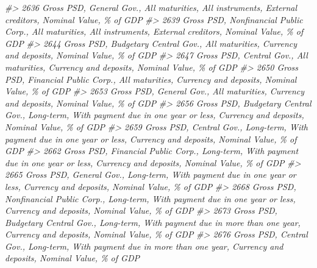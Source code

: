 \documentclass[
]{bxjsbook}
\newenvironment{Shaded}{\begin{snugshade}}{\end{snugshade}}
\newcommand{\CommentTok}[1]{\textcolor[rgb]{0.56,0.35,0.01}{\textit{#1}}}
\theoremstyle{definition}
\theoremstyle{definition}
\theoremstyle{definition}
\theoremstyle{definition}
\theoremstyle{remark}
\begin{document}
\begin{Shaded}
\begin{Highlighting}[]
\CommentTok{\#\textgreater{} 2636                                                                      Gross PSD, General Gov., All maturities, All instruments, External creditors, Nominal Value, \% of GDP}
\CommentTok{\#\textgreater{} 2639                                                         Gross PSD, Nonfinancial Public Corp., All maturities, All instruments, External creditors, Nominal Value, \% of GDP}
\CommentTok{\#\textgreater{} 2644                                                                          Gross PSD, Budgetary Central Gov., All maturities, Currency and deposits, Nominal Value, \% of GDP}
\CommentTok{\#\textgreater{} 2647                                                                                    Gross PSD, Central Gov., All maturities, Currency and deposits, Nominal Value, \% of GDP}
\CommentTok{\#\textgreater{} 2650                                                                          Gross PSD, Financial Public Corp., All maturities, Currency and deposits, Nominal Value, \% of GDP}
\CommentTok{\#\textgreater{} 2653                                                                                    Gross PSD, General Gov., All maturities, Currency and deposits, Nominal Value, \% of GDP}
\CommentTok{\#\textgreater{} 2656                                         Gross PSD, Budgetary Central Gov., Long{-}term, With payment due in one year or less, Currency and deposits, Nominal Value, \% of GDP}
\CommentTok{\#\textgreater{} 2659                                                   Gross PSD, Central Gov., Long{-}term, With payment due in one year or less, Currency and deposits, Nominal Value, \% of GDP}
\CommentTok{\#\textgreater{} 2662                                         Gross PSD, Financial Public Corp., Long{-}term, With payment due in one year or less, Currency and deposits, Nominal Value, \% of GDP}
\CommentTok{\#\textgreater{} 2665                                                   Gross PSD, General Gov., Long{-}term, With payment due in one year or less, Currency and deposits, Nominal Value, \% of GDP}
\CommentTok{\#\textgreater{} 2668                                      Gross PSD, Nonfinancial Public Corp., Long{-}term, With payment due in one year or less, Currency and deposits, Nominal Value, \% of GDP}
\CommentTok{\#\textgreater{} 2673                                       Gross PSD, Budgetary Central Gov., Long{-}term, With payment due in more than one year, Currency and deposits, Nominal Value, \% of GDP}
\CommentTok{\#\textgreater{} 2676                                                 Gross PSD, Central Gov., Long{-}term, With payment due in more than one year, Currency and deposits, Nominal Value, \% of GDP}

\end{Highlighting}
\end{Shaded}
\end{document}
